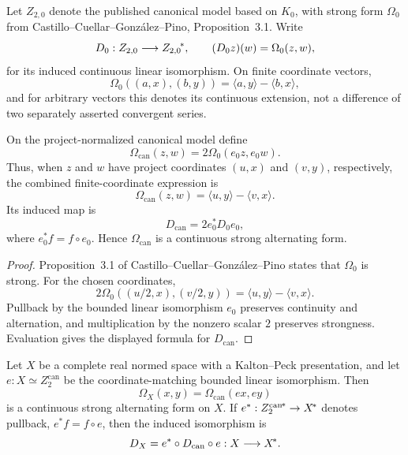 \begin{theorem}\label{thm:ks-primary}
Let $Z_{2,0}$ denote the published canonical model based on $K_0$, with strong form
$\Omega_0$ from Castillo--Cuellar--Gonz\'alez--Pino, Proposition~3.1.  Write
\[
  D_0:Z_{2,0}\longrightarrow{Z_{2,0}}^{\!*},
  \qquad (D_0z)(w)=\Omega_0(z,w),
\]
for its induced continuous linear isomorphism.  On finite coordinate vectors,
\[
  \Omega_0((a,x),(b,y))=\langle a,y\rangle-\langle b,x\rangle,
\]
and for arbitrary vectors this denotes its continuous extension, not a difference of two
separately asserted convergent series.

On the project-normalized canonical model define
\[
  \Omega_{\mathrm{can}}(z,w)=2\Omega_0(e_0z,e_0w).
\]
Thus, when $z$ and $w$ have project coordinates $(u,x)$ and $(v,y)$, respectively, the combined
finite-coordinate expression is
\[
  \Omega_{\mathrm{can}}(z,w)
    =\langle u,y\rangle-\langle v,x\rangle.
\]
Its induced map is
\[
  D_{\mathrm{can}}=2e_0^*D_0e_0,
\]
where $e_0^*f=f\circ e_0$.  Hence $\Omega_{\mathrm{can}}$ is a continuous strong alternating form.
\leanok
\end{theorem}

\begin{proof}
Proposition~3.1 of Castillo--Cuellar--Gonz\'alez--Pino \cite{CCGP} states that $\Omega_0$ is strong.
For the chosen coordinates,
\[
  2\Omega_0((u/2,x),(v/2,y))
    =\langle u,y\rangle-\langle v,x\rangle.
\]
Pullback by the bounded linear isomorphism $e_0$ preserves continuity and alternation, and
multiplication by the nonzero scalar $2$ preserves strongness.  Evaluation gives the displayed
formula for $D_{\mathrm{can}}$.
\end{proof}

\begin{theorem}\label{thm:ks-transport}
Let $X$ be a complete real normed space with a Kalton--Peck presentation, and let
$e:X\simeq Z_2^{\mathrm{can}}$ be the coordinate-matching bounded linear isomorphism.  Then
\[
  \Omega_X(x,y)=\Omega_{\mathrm{can}}(ex,ey)
\]
is a continuous strong alternating form on $X$.  If
$e^*:{Z_2^{\mathrm{can}}}^{\!*}\to{X}^{\!*}$ denotes pullback, $e^*f=f\circ e$, then the
induced isomorphism is
\[
  D_X=e^*\circ D_{\mathrm{can}}\circ e:X\longrightarrow{X}^{\!*}.
\]
\leanok
\end{theorem}

